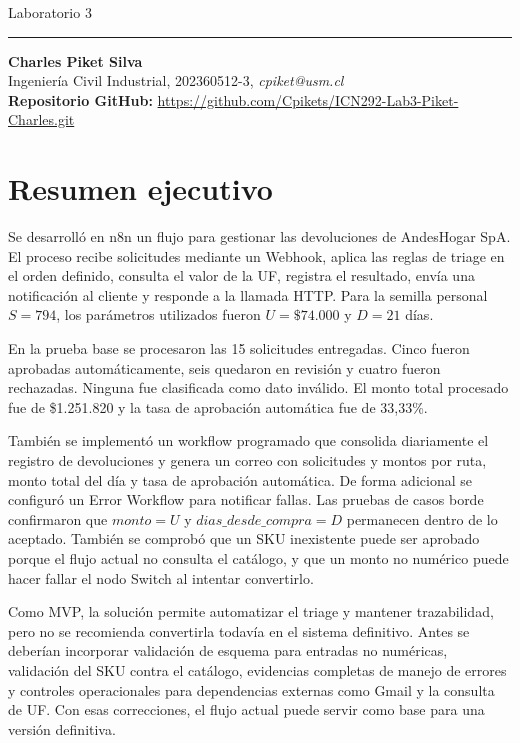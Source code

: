 \documentclass[10pt,a4paper]{article}
\begin{document}
\begin{center}
\vspace{-2mm}
{\Huge Laboratorio 3}\\
{\Large {}}

\vspace{2mm}
\hrule

\textbf{Charles Piket Silva} \\
{\small Ingeniería Civil Industrial, 202360512-3, \emph{cpiket@usm.cl}}\\
{\small \textbf{Repositorio GitHub:} \url{https://github.com/Cpikets/ICN292-Lab3-Piket-Charles.git}}
\end{center}

\section*{Resumen ejecutivo}

Se desarrolló en n8n un flujo para gestionar las devoluciones de AndesHogar SpA. El proceso recibe solicitudes mediante un Webhook, aplica las reglas de triage en el orden definido, consulta el valor de la UF, registra el resultado, envía una notificación al cliente y responde a la llamada HTTP. Para la semilla personal $S=794$, los parámetros utilizados fueron $U=\$74.000$ y $D=21$ días.

En la prueba base se procesaron las 15 solicitudes entregadas. Cinco fueron aprobadas automáticamente, seis quedaron en revisión y cuatro fueron rechazadas. Ninguna fue clasificada como dato inválido. El monto total procesado fue de \$1.251.820 y la tasa de aprobación automática fue de 33,33\%.

También se implementó un workflow programado que consolida diariamente el registro de devoluciones y genera un correo con solicitudes y montos por ruta, monto total del día y tasa de aprobación automática. De forma adicional se configuró un Error Workflow para notificar fallas. Las pruebas de casos borde confirmaron que $monto=U$ y $dias\_desde\_compra=D$ permanecen dentro de lo aceptado. También se comprobó que un SKU inexistente puede ser aprobado porque el flujo actual no consulta el catálogo, y que un monto no numérico puede hacer fallar el nodo Switch al intentar convertirlo.

Como MVP, la solución permite automatizar el triage y mantener trazabilidad, pero no se recomienda convertirla todavía en el sistema definitivo. Antes se deberían incorporar validación de esquema para entradas no numéricas, validación del SKU contra el catálogo, evidencias completas de manejo de errores y controles operacionales para dependencias externas como Gmail y la consulta de UF. Con esas correcciones, el flujo actual puede servir como base para una versión definitiva.
\end{document}
